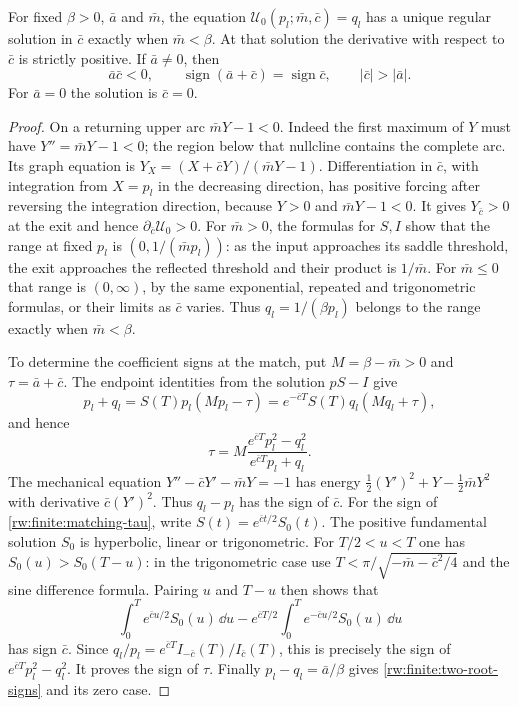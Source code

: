\begin{lemma}
\label{rw:finite:two-root-geometry}
For fixed $\beta>0$, $\bar a$ and $\bar m$, the equation
$\mathcal U_0(p_l;\bar m,\bar c)=q_l$ has a unique regular
solution in $\bar c$ exactly when $\bar m<\beta$.
At that solution the derivative with respect to $\bar c$ is
strictly positive. If $\bar a\ne0$, then
\begin{equation}\label{rw:finite:two-root-signs}
 \bar a\bar c<0,\qquad
 \operatorname{sign}(\bar a+\bar c)=\operatorname{sign}\bar c,
 \qquad |\bar c|>|\bar a|.
\end{equation}
For $\bar a=0$ the solution is $\bar c=0$.
\end{lemma}
\begin{proof}
On a returning upper arc $\bar mY-1<0$. Indeed the first
maximum of $Y$ must have $Y''=\bar mY-1<0$; the region below
that nullcline contains the complete arc. Its graph equation is
$Y_X=(X+\bar cY)/(\bar mY-1)$. Differentiation in $\bar c$,
with integration from $X=p_l$ in the decreasing direction, has
positive forcing after reversing the integration direction, because
$Y>0$ and $\bar mY-1<0$. It gives $Y_{\bar c}>0$ at the
exit and hence $\partial_{\bar c}\mathcal U_0>0$.
For $\bar m>0$, the formulas for $S,I$ show that the range at
fixed $p_l$ is $(0,1/(\bar mp_l))$: as the input approaches its
saddle threshold, the exit approaches the reflected threshold and
their product is $1/\bar m$. For $\bar m\le0$ that range is
$(0,\infty)$, by the same exponential, repeated and trigonometric
formulas, or their limits as $\bar c$ varies. Thus $q_l=1/(\beta p_l)$
belongs to the range exactly when $\bar m<\beta$.

To determine the coefficient signs at the match, put
$M=\beta-\bar m>0$ and $\tau=\bar a+\bar c$.
The endpoint identities from the solution $pS-I$ give
\[
 p_l+q_l=S(T)p_l(Mp_l-\tau)
       =e^{-\bar cT}S(T)q_l(Mq_l+\tau),
\]
and hence
\begin{equation}\label{rw:finite:matching-tau}
 \tau=M\frac{e^{\bar cT}p_l^2-q_l^2}
                      {e^{\bar cT}p_l+q_l}.
\end{equation}
The mechanical equation $Y''-\bar cY'-\bar mY=-1$ has energy
$\frac12(Y')^2+Y-\frac12\bar mY^2$ with derivative
$\bar c(Y')^2$. Thus $q_l-p_l$ has the sign of $\bar c$.
For the sign of \eqref{rw:finite:matching-tau}, write
$S(t)=e^{\bar ct/2}S_0(t)$. The positive fundamental solution
$S_0$ is hyperbolic, linear or trigonometric. For $T/2<u<T$
one has $S_0(u)>S_0(T-u)$: in the trigonometric case use
$T<\pi/\sqrt{-\bar m-\bar c^2/4}$ and the sine difference
formula. Pairing $u$ and $T-u$ then shows that
\[
 \int_0^T e^{\bar cu/2}S_0(u)\,\dd u
       -e^{\bar cT/2}\int_0^T e^{-\bar cu/2}S_0(u)\,\dd u
\]
has sign $\bar c$.
Since $q_l/p_l=e^{\bar cT}I_{-\bar c}(T)/I_{\bar c}(T)$,
this is precisely the sign of $e^{\bar cT}p_l^2-q_l^2$.
It proves the sign of $\tau$. Finally $p_l-q_l=\bar a/\beta$
gives \eqref{rw:finite:two-root-signs} and its zero case.
\end{proof}

